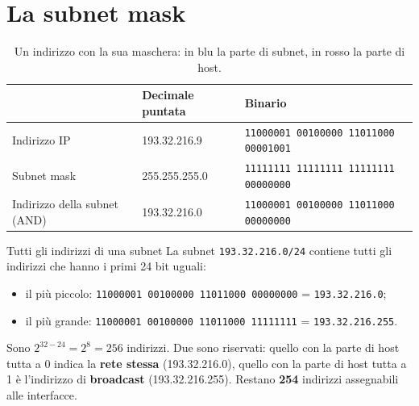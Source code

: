 \section{La subnet mask}


\begin{table}[H]
\centering
\begin{tabular}{lll}
\toprule
 & \textbf{Decimale puntata} & \textbf{Binario} \\
\midrule
Indirizzo IP & 193.32.216.9 & \texttt{\textcolor{netblue}{11000001 00100000 11011000} \textcolor{netred}{00001001}} \\
Subnet mask & 255.255.255.0 & \texttt{\textcolor{netblue}{11111111 11111111 11111111} \textcolor{netred}{00000000}} \\
\midrule
Indirizzo della subnet (AND) & 193.32.216.0 & \texttt{\textcolor{netblue}{11000001 00100000 11011000} 00000000} \\
\bottomrule
\end{tabular}
\caption{Un indirizzo con la sua maschera: in blu la parte di subnet, in rosso la parte di host.}
\end{table}


\begin{esempio}{Tutti gli indirizzi di una subnet}
La subnet \texttt{193.32.216.0/24} contiene tutti gli indirizzi che hanno i primi 24 bit uguali:
\begin{itemize}
    \item il più piccolo: \texttt{11000001 00100000 11011000 00000000} = \texttt{193.32.216.0};
    \item il più grande: \texttt{11000001 00100000 11011000 11111111} = \texttt{193.32.216.255}.
\end{itemize}
Sono $2^{32-24} = 2^8 = 256$ indirizzi. Due sono riservati: quello con la parte di host tutta a 0 indica la
\textbf{rete stessa} (193.32.216.0), quello con la parte di host tutta a 1 è l'indirizzo di \textbf{broadcast}
(193.32.216.255). Restano \textbf{254} indirizzi assegnabili alle interfacce.
\end{esempio}

